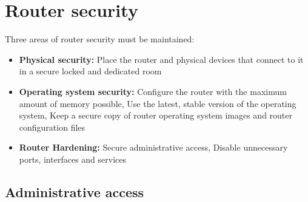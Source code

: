 \chapter{Router security}

Three areas of router security must be maintained:

\begin{itemize}
\item \textbf{Physical security:} Place the router and physical devices that connect to it in a secure locked and dedicated room 

\item \textbf{Operating system security:} Configure the router with the maximum amount of memory possible, Use the latest, stable version of the operating system, Keep a secure copy of router operating system images and router configuration files

\item \textbf{Router Hardening:} Secure administrative access, Disable unnecessary ports, interfaces and services
\end{itemize}


\section{Administrative access}
%
%
%
%
%

